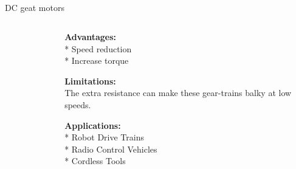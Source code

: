 \subsection{}
{
\begin{frame}{DC geat motors}

\begin{columns}
\begin{column}{0.4\textwidth}  %

	\vspace{-3mm}
   	\begin{figure}
 	\end{figure}

\end{column}

\begin{column}{0.6\textwidth}

{\bf Advantages:} \\
* Speed reduction \\
* Increase torque

{\bf Limitations:} \\
The extra resistance can make these gear-trains balky at low speeds.

{\bf Applications:} \\
* Robot Drive Trains \\
* Radio Control Vehicles \\
* Cordless Tools



\end{column}
\end{columns}
\end{frame}
}





